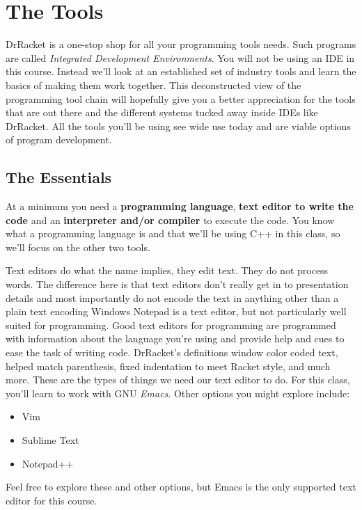 \documentclass[]{tufte-handout}
\begin{document}
\section{The Tools}

DrRacket is a one-stop shop for all your programming tools needs.  Such programs are called \textit{Integrated Development Environments}. You will not be using an IDE in this course.  Instead we'll look at an established set of industry tools and learn the basics of making them work together.  This deconstructed view of the programming tool chain will hopefully give you a better appreciation for the tools that are out there and the different systems tucked away inside IDEs like DrRacket.  All the tools you'll be using see wide use today and are viable options of program development.  

\subsection{The Essentials}

At a minimum you need a \textbf{programming language}, \textbf{text editor to write the code} and an \textbf{interpreter and/or compiler} to execute the code. You know what a programming language is and that we'll be using C++ in this class, so we'll focus on the other two tools.

Text editors do what the name implies, they edit text. They do not process words. The difference here is that text editors don't really get in to presentation details and most importantly do not encode the text in anything other than a plain text encoding  Windows Notepad is a text editor, but not particularly well suited for programming. Good text editors for programming are programmed with information about the language you're using and provide help and cues to ease the task of writing code.  DrRacket's definitions window color coded text, helped match parenthesis, fixed indentation to meet Racket style, and much more.  These are the types of things we need our text editor to do. For this class, you'll learn to work with GNU \textit{Emacs}. Other options you might explore include:
\begin{itemize}
\item Vim
\item Sublime Text
\item Notepad++
\end{itemize}
Feel free to explore these and other options, but Emacs is the only supported text editor for this course.
\end{document}
